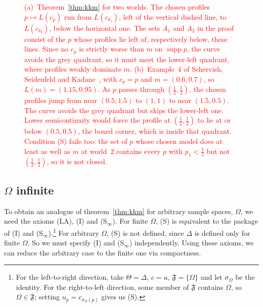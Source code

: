 \documentclass[11pt]{article}
\theoremstyle{definition}
\theoremstyle{remark}
\newcommand{\F}{\mathfrak F}
\newcommand{\supp}{\operatorname{supp}}
\begin{document}
\begin{figure}[ht]
\caption{\textcolor{red}{(a)~Theorem~\ref{thm:kkm} for two worlds. The chosen profiles $p\mapsto L(c_p)$ run from $L(c_{\delta_1})$, left of the vertical dashed line, to $L(c_{\delta_2})$, below the horizontal one. The sets $A_1$ and $A_2$ in the proof consist of the $p$ whose profiles lie left of, respectively below, these lines. Since no $c_p$ is strictly worse than $m$ on $\supp p$, the curve avoids the grey quadrant, so it must meet the lower-left quadrant, where profiles weakly dominate $m$. (b)~Example~4 of Schervish, Seidenfeld and Kadane~\cite{SSK09}, with $c_p=p$ and $m=(0.6,0.7)$, so $L(m)=(1.15,0.95)$. As $p$ passes through $(\tfrac12,\tfrac12)$, the chosen profiles jump from near $(0.5,1.5)$ to $(1,1)$ to near $(1.5,0.5)$. The curve avoids the grey quadrant but skips the lower-left one. Lower semicontinuity would force the profile at $(\tfrac12,\tfrac12)$ to lie at or below $(0.5,0.5)$, the boxed corner, which is inside that quadrant. Condition (S) fails too: the set of $p$ whose chosen model does at least as well as $m$ at world~$2$ contains every $p$ with $p_1<\tfrac12$ but not $(\tfrac12,\tfrac12)$, so it is not closed.}}
\label{fig:profiles}
\end{figure}






\subsection{$\Omega$ infinite}\label{sec:infinite}


To obtain an analogue of theorem~\ref{thm:kkm} for arbitrary sample spaces, $\Omega$, we need the axioms (LA), (I) and (S$_\infty$). For finite $\Omega$, (S) is equivalent to the package of (I) and (S$_\infty$).\footnote{For the left-to-right direction, take $\Theta=\Delta$, $c=u$, $\F=\{\Omega\}$ and let $\sigma_\Omega$ be the identity. For the right-to-left direction, some member of $\F$ contains $\Omega$, so $\Omega\in\F$; setting $u_p=c_{\sigma_\Omega(p)}$ gives us (S).} For arbitrary $\Omega$, (S) is not defined, since $\Delta$ is defined only for finite $\Omega$. So we must specify (I) and (S$_\infty$) independently. Using these axioms, we can reduce the arbitrary case to the finite one via compactness.
\end{document}
